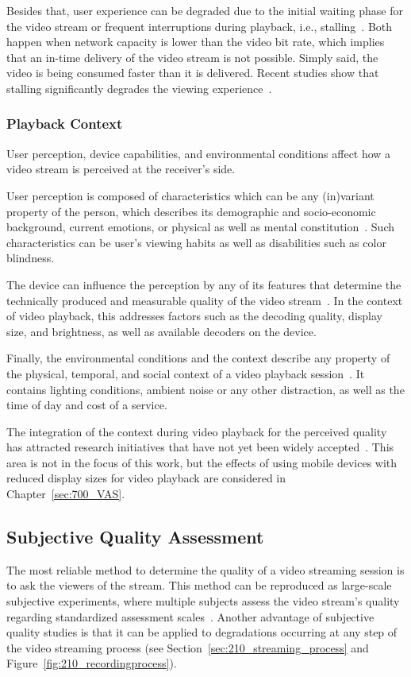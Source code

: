 Besides that, user experience can be degraded due to the initial waiting phase for the video stream or frequent interruptions during playback, i.e., \ac{stalling}~\cite{Hossfeld2012}.
Both happen when network capacity is lower than the video bit rate, which implies that an in-time delivery of the video stream is not possible.
Simply said, the video is being consumed faster than it is delivered.
Recent studies show that \ac{stalling} significantly degrades the viewing experience~\cite{Hossfeld2012,Hossfeld2013,Hossfeld2014}.
\subsubsection{Playback Context}
User perception, device capabilities, and environmental conditions affect how a video stream is perceived at the receiver's side.

User perception is composed of characteristics which can be any (in)variant property of the person, which describes its demographic and socio-economic background, current emotions, or physical as well as mental constitution~\cite{Qualinet2013}.
Such characteristics can be user's viewing habits as well as disabilities such as color blindness.

The device can influence the perception by any of its features that determine the technically produced and measurable quality of the video stream~\cite{Qualinet2013}.
In the context of video playback, this addresses factors such as the decoding quality, display size, and brightness, as well as available decoders on the device.

Finally, the environmental conditions and the context describe any property of the physical, temporal, and social context of a video playback session~\cite{Qualinet2013}.
It contains lighting conditions, ambient noise or any other distraction, as well as the time of day and cost of a service.

The integration of the context during video playback for the perceived quality has attracted research initiatives that have not yet been widely accepted~\cite{Kroupi2014,Luo2008,Moorthy2012,Scholler2012}.
This area is not in the focus of this work, but the effects of using mobile devices with reduced display sizes for video playback are considered in Chapter~\ref{sec:700_VAS}.
\subsection{Subjective Quality Assessment}
\label{sec:210_subjective_quality}
The most reliable method to determine the quality of a video streaming session is to ask the viewers of the stream.
This method can be reproduced as large-scale subjective experiments, where multiple subjects assess the video stream's quality regarding standardized assessment scales~\cite{Winkler2008}.
Another advantage of subjective quality studies is that it can be applied to degradations occurring at any step of the video streaming process (see Section~\ref{sec:210_streaming_process} and Figure~\ref{fig:210_recordingprocess}). 

